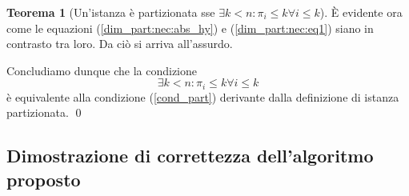 \documentclass{article}
\theoremstyle{definition}
\newtheorem{theorem}{Teorema}
\begin{document}
\begin{theorem}[Un'istanza è partizionata sse $\exists k < n : \pi_i \leq k \forall i \leq k$]
    È evidente ora come le equazioni (\ref{dim_part:nec:abs_hy}) e (\ref{dim_part:nec:eq1}) siano in contrasto tra loro.
    Da ciò si arriva all'assurdo.

    Concludiamo dunque che la condizione
    \begin{equation}\label{dim_part:cond_sempl}
        \exists k < n : \pi_i \leq k \forall i \leq k
    \end{equation}
    è equivalente alla condizione (\ref{cond_part}) derivante dalla definizione di istanza partizionata.
    \qed

\end{theorem}

\subsection{Dimostrazione di correttezza dell'algoritmo proposto}
\end{document}
